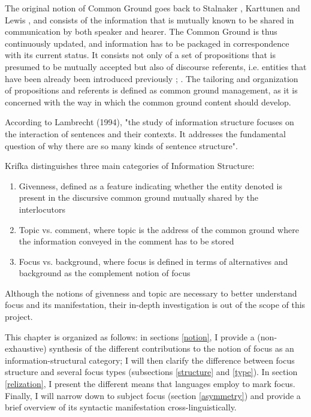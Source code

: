 \documentclass[12pt]{report}
\begin{document}
The original notion of Common Ground goes back to Stalnaker \cite{stalnaker1974pragmatic}, Karttunen \cite{karttunen1974presupposition} and Lewis \cite{lewis1979scorekeeping}, and consists of the information that is mutually known to be shared in communication by both speaker and hearer.
The Common Ground is thus continuously updated, and information has to be packaged in correspondence with its current status. It consists not only of a set of propositions that is presumed to be mutually accepted but also of discourse referents, i.e. entities that have been already been introduced previously \cite{kamp1981theory}; \cite{heim1982semantics}. The tailoring and organization of propositions and referents is defined as common ground management, as it is concerned with the way in which the common ground content should develop.

According to Lambrecht (1994), "the study of information structure focuses on the interaction of sentences and their contexts. It addresses the fundamental question of why there are so
many kinds of sentence structure".


Krifka \cite{krifka2008basic} distinguishes three main categories of Information Structure:\\
\begin{enumerate}
    \item Givenness, defined as a feature indicating whether the entity denoted is present in the discursive common ground mutually shared by the interlocutors
    \item Topic vs. comment, where topic is the address of the common ground where the information conveyed in the comment has to be stored
    \item Focus vs. background, where focus is defined in terms of alternatives and background as the complement notion of focus
\end{enumerate}{}

\noindent
 Although the notions of givenness and topic are necessary to better understand focus and its manifestation, their in-depth investigation is out of the scope of this project. 
 
 
 This chapter is organized as follows: in sections \ref{notion}, I provide a (non-exhaustive) synthesis of the different contributions to the notion of focus as an information-structural category; I will then clarify the difference between focus structure and several focus types (subsections \ref{structure} and \ref{type}). In section \ref{relization}, I present the different means that languages employ to mark focus. Finally, I will narrow down to subject focus (section \ref{asymmetry}) and provide a brief overview of its syntactic manifestation cross-linguistically. 
\end{document}
